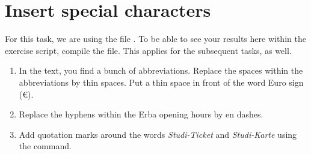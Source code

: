 \section{Insert special characters}

For this task, we are using the file .
To be able to see your results here within the exercise script,
compile the  file.
This applies for the subsequent tasks, as well.

\begin{enumerate}
	\item In the text, you find a bunch of abbreviations. Replace the spaces 
	within the abbreviations by thin spaces. Put a thin space in front of the 
	word Euro sign (€).
	\item Replace the hyphens within the Erba opening hours by en dashes.
	\item Add quotation marks around the words \emph{Studi-Ticket} and 
	\emph{Studi-Karte} using the  command. 
\end{enumerate}
